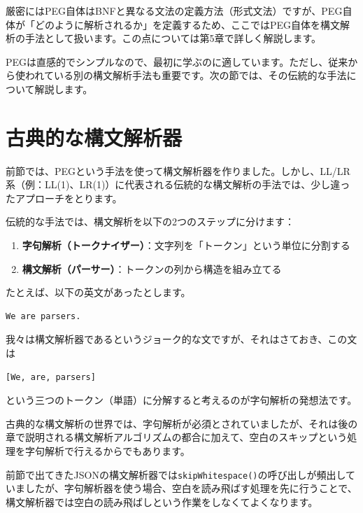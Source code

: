 厳密にはPEG自体はBNFと異なる文法の定義方法（形式文法）ですが、PEG自体が「どのように解析されるか」を定義するため、ここではPEG自体を構文解析の手法として扱います。この点については第5章で詳しく解説します。

PEGは直感的でシンプルなので、最初に学ぶのに適しています。ただし、従来から使われている別の構文解析手法も重要です。次の節では、その伝統的な手法について解説します。

\hypertarget{chapter3-ux53e4ux5178ux7684ux306aux69cbux6587ux89e3ux6790ux5668}{%
\section{古典的な構文解析器}\label{chapter3-ux53e4ux5178ux7684ux306aux69cbux6587ux89e3ux6790ux5668}}

前節では、PEGという手法を使って構文解析器を作りました。しかし、LL/LR系（例：LL(1)、LR(1)）に代表される伝統的な構文解析の手法では、少し違ったアプローチをとります。

伝統的な手法では、構文解析を以下の2つのステップに分けます：

\begin{enumerate}
\def\labelenumi{\arabic{enumi}.}
\tightlist
\item
  \textbf{字句解析（トークナイザー）}：文字列を「トークン」という単位に分割する
\item
  \textbf{構文解析（パーサー）}：トークンの列から構造を組み立てる
\end{enumerate}

たとえば、以下の英文があったとします。

\begin{verbatim}
We are parsers.
\end{verbatim}

我々は構文解析器であるというジョーク的な文ですが、それはさておき、この文は

\begin{verbatim}
[We, are, parsers]
\end{verbatim}

という三つのトークン（単語）に分解すると考えるのが字句解析の発想法です。

古典的な構文解析の世界では、字句解析が必須とされていましたが、それは後の章で説明される構文解析アルゴリズムの都合に加えて、空白のスキップという処理を字句解析で行えるからでもあります。

前節で出てきたJSONの構文解析器では\texttt{skipWhitespace()}の呼び出しが頻出していましたが、字句解析器を使う場合、空白を読み飛ばす処理を先に行うことで、構文解析器では空白の読み飛ばしという作業をしなくてよくなります。

